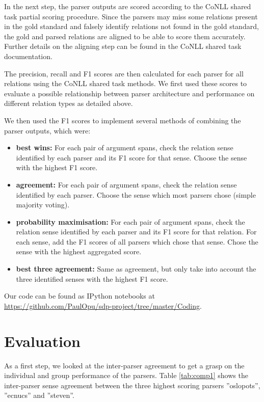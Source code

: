 \documentclass[10pt,notitlepage]{scrartcl}
\begin{document}
In the next step, the parser outputs are scored according to the CoNLL shared task partial scoring procedure. Since the parsers may miss some relations present in the gold standard and falsely identify relations not found in the gold standard, the gold and parsed relations are aligned to be able to score them accurately. Further details on the aligning step can be found in the CoNLL shared task documentation.

The precision, recall and F1 scores are then calculated for each parser for all relations using the CoNLL shared task methods. We first used these scores to evaluate a possible relationship between parser architecture and performance on different relation types as detailed above.

We then used the F1 scores to implement several methods of combining the parser outputs, which were:
\begin{itemize}
\item \textbf{best wins:} For each pair of argument spans, check the relation sense identified by each parser and its F1 score for that sense. Choose the sense with the highest F1 score.
\item \textbf{agreement:} For each pair of argument spans, check the relation sense identified by each parser. Choose the sense which most parsers chose (simple majority voting).
\item \textbf{probability maximisation:} For each pair of argument spans, check the relation sense identified by each parser and its F1 score for that relation. For each sense, add the F1 scores of all parsers which chose that sense. Chose the sense with the highest aggregated score.
\item \textbf{best three agreement:} Same as agreement, but only take into account the three identified senses with the highest F1 score.
\end{itemize}

Our code can be found as IPython notebooks at \url{https://github.com/PaulOpu/sdp-project/tree/master/Coding}.

\section*{Evaluation}
As a first step, we looked at the inter-parser agreement to get a grasp on the individual and group performance of the parsers. Table \ref{tab:comp1} shows the inter-parser sense agreement between the three highest scoring parsers ''oslopots'', ''ecnucs'' and ''steven''.
\end{document}
